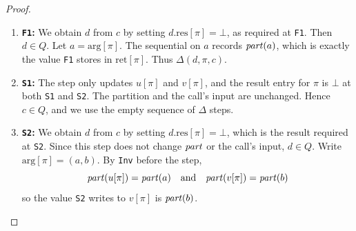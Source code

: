\documentclass[12pt]{amsproc}
\begin{document}
\begin{enumerate}
\begin{proof}
\begin{itemize}
\begin{enumerate}
            Since this step changes $\partition$, we also need to check the other processes at \texttt{S3}: 
            \begin{itemize}
                \item If $c$ records $\bot$, then we are done. 
                \item If $c$ records \False{} for such a process $\pi'$, then $u[\pi']$ is a representative after the union. Since a union only retires a representative and never creates a new one, $u[\pi']$ was also a representative before the union. Hence these \False{} entries are allowed in $d$, and $d\in Q$. 
            \end{itemize} 
            
            By \texttt{TypeOK} after the step, the new partition is idempotent. Applying $\pi$'s union to $d$ with the same choice of representative gives the partition in $c$ and records \texttt{ACK}, which is $c.\mathrm{res}[\pi]=\mathrm{ret}[\pi]$ at \texttt{UR}. Thus $\Delta(d,\pi,c)$.

            \item \textbf{\texttt{F1}:}
            We obtain $d$ from $c$ by setting $d.\mathrm{res}[\pi]=\bot$, as required at \texttt{F1}. Then $d\in Q$. Let $a=\mathrm{arg}[\pi]$. The sequential \Find{} on $a$ records $\mathit{part}(a)$, which is exactly the value \texttt{F1} stores in $\mathrm{ret}[\pi]$. Thus $\Delta(d,\pi,c)$.

            \item \textbf{\texttt{S1}:}
            The step only updates $u[\pi]$ and $v[\pi]$, and the result entry for $\pi$ is $\bot$ at both \texttt{S1} and \texttt{S2}. The partition and the call's input are unchanged. Hence $c\in Q$, and we use the empty sequence of $\Delta$ steps.
            
            \item \textbf{\texttt{S2}:}
            We obtain $d$ from $c$ by setting $d.\mathrm{res}[\pi]=\bot$, which is the result required at \texttt{S2}. Since this step does not change $\partition$ or the call's input, $d\in Q$. Write $\mathrm{arg}[\pi]=(a,b)$. By \texttt{Inv} before the step, 
            \[\mathit{part}(u[\pi])=\mathit{part}(a) \quad \text{and} \quad \mathit{part}(v[\pi])=\mathit{part}(b)\]
             so the value \texttt{S2} writes to $v[\pi]$ is $\mathit{part}(b)$.


\end{enumerate}
\end{itemize}
\end{proof}
\end{enumerate}
\end{document}
